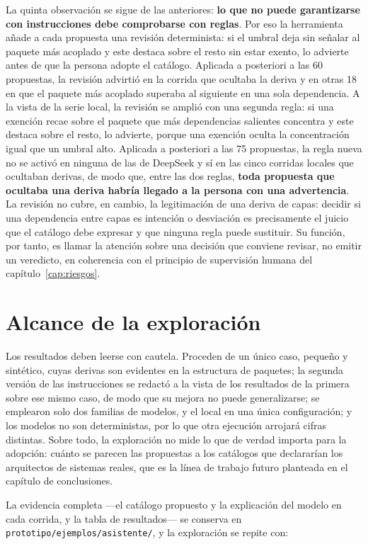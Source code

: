 La quinta observación se sigue de las anteriores: \textbf{lo que no puede garantizarse con instrucciones debe comprobarse con reglas}. Por eso la herramienta añade a cada propuesta una revisión determinista: si el umbral deja sin señalar al paquete más acoplado y este destaca sobre el resto sin estar exento, lo advierte antes de que la persona adopte el catálogo. Aplicada a posteriori a las 60 propuestas, la revisión advirtió en la corrida que ocultaba la deriva y en otras 18 en que el paquete más acoplado superaba al siguiente en una sola dependencia. A la vista de la serie local, la revisión se amplió con una segunda regla: si una exención recae sobre el paquete que más dependencias salientes concentra y este destaca sobre el resto, lo advierte, porque una exención oculta la concentración igual que un umbral alto. Aplicada a posteriori a las 75 propuestas, la regla nueva no se activó en ninguna de las de DeepSeek y sí en las cinco corridas locales que ocultaban derivas, de modo que, entre las dos reglas, \textbf{toda propuesta que ocultaba una deriva habría llegado a la persona con una advertencia}. La revisión no cubre, en cambio, la legitimación de una deriva de capas: decidir si una dependencia entre capas es intención o desviación es precisamente el juicio que el catálogo debe expresar y que ninguna regla puede sustituir. Su función, por tanto, es llamar la atención sobre una decisión que conviene revisar, no emitir un veredicto, en coherencia con el principio de supervisión humana del capítulo~\ref{cap:riesgos}.

\section{Alcance de la exploración}
Los resultados deben leerse con cautela. Proceden de un único caso, pequeño y sintético, cuyas derivas son evidentes en la estructura de paquetes; la segunda versión de las instrucciones se redactó a la vista de los resultados de la primera sobre ese mismo caso, de modo que su mejora no puede generalizarse; se emplearon solo dos familias de modelos, y el local en una única configuración; y los modelos no son deterministas, por lo que otra ejecución arrojará cifras distintas. Sobre todo, la exploración no mide lo que de verdad importa para la adopción: cuánto se parecen las propuestas a los catálogos que declararían los arquitectos de sistemas reales, que es la línea de trabajo futuro planteada en el capítulo de conclusiones.

La evidencia completa ---el catálogo propuesto y la explicación del modelo en cada corrida, y la tabla de resultados--- se conserva en \texttt{prototipo/ejemplos/asistente/}, y la exploración se repite con:

